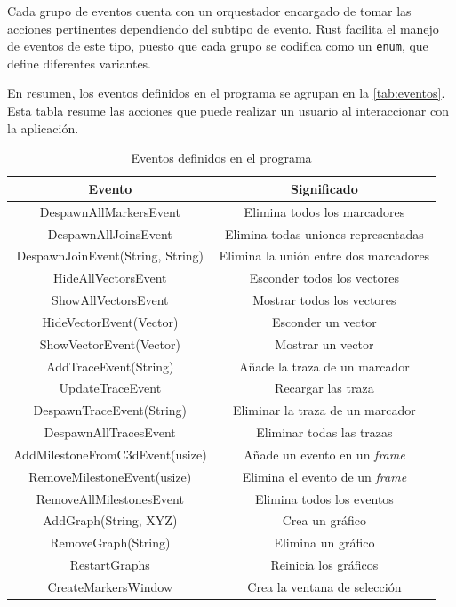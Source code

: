 Cada grupo de eventos cuenta con un orquestador encargado de tomar las acciones pertinentes dependiendo del subtipo de evento. Rust facilita el manejo de eventos de este tipo, puesto que cada grupo se codifica como un \texttt{enum}, que define diferentes variantes.

En resumen, los eventos definidos en el programa se agrupan en la \autoref{tab:eventos}. Esta tabla resume las acciones que puede realizar un usuario al interaccionar con la aplicación.

\begin{table}[H]
  \centering
  \begin{tabular}{c|c}
  \toprule
  {\textbf{Evento}} & {\textbf{Significado}} \\
  \midrule
  DespawnAllMarkersEvent & Elimina todos los marcadores \\
  DespawnAllJoinsEvent & Elimina todas uniones representadas \\
  DespawnJoinEvent(String, String) & Elimina la unión entre dos marcadores \\
  HideAllVectorsEvent & Esconder todos los vectores \\
  ShowAllVectorsEvent & Mostrar todos los vectores \\
  HideVectorEvent(Vector) & Esconder un vector \\
  ShowVectorEvent(Vector) & Mostrar un vector \\  
  AddTraceEvent(String) & Añade la traza de un marcador \\
  UpdateTraceEvent & Recargar las traza \\
  DespawnTraceEvent(String) & Eliminar la traza de un marcador \\
  DespawnAllTracesEvent & Eliminar todas las trazas\\
  AddMilestoneFromC3dEvent(usize) & Añade un evento en un \textit{frame} \\
  RemoveMilestoneEvent(usize) & Elimina el evento de un \textit{frame} \\
  RemoveAllMilestonesEvent & Elimina todos los eventos \\
  AddGraph(String, XYZ) & Crea un gráfico \\
  RemoveGraph(String) & Elimina un gráfico \\
  RestartGraphs & Reinicia los gráficos \\
  CreateMarkersWindow & Crea la ventana de selección \\  
  \bottomrule
  \end{tabular}
  \caption{Eventos definidos en el programa}
  \label{tab:eventos}
\end{table}


